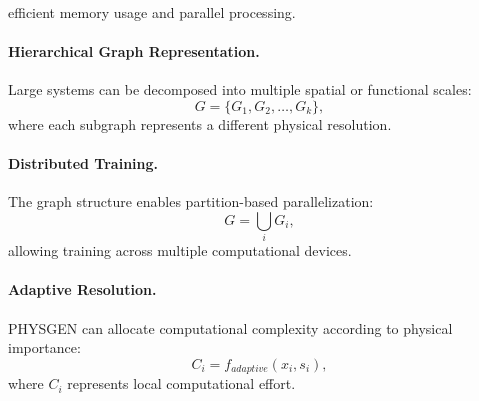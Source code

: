 efficient memory usage and parallel processing. \paragraph{Hierarchical Graph Representation.} Large systems can be decomposed into multiple spatial or functional scales: \begin{equation} G= \{G_1,G_2,\dots,G_k\}, \end{equation} where each subgraph represents a different physical resolution. \paragraph{Distributed Training.} The graph structure enables partition-based parallelization: \begin{equation} G = \bigcup_i G_i, \end{equation} allowing training across multiple computational devices. \paragraph{Adaptive Resolution.} PHYSGEN can allocate computational complexity according to physical importance: \begin{equation} C_i=f_{adaptive}(x_i,s_i), \end{equation} where $C_i$ represents local computational effort. %
